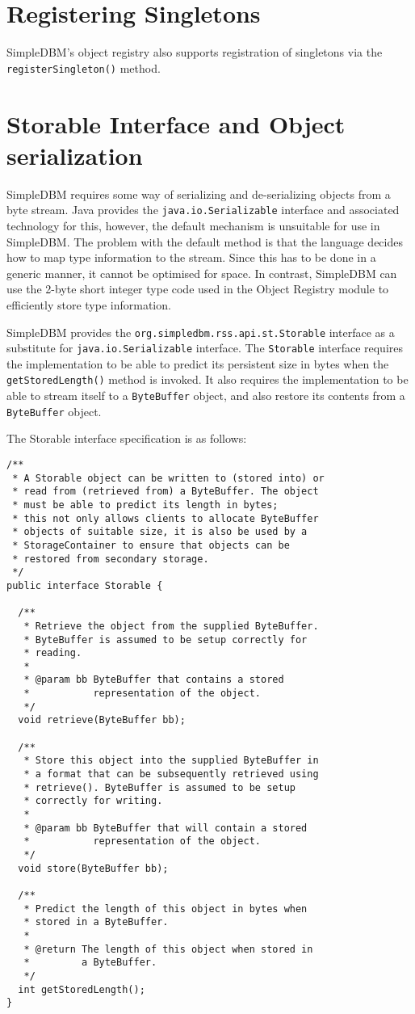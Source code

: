 \documentclass[a4paper,draft,oneside]{book}
\begin{document}
\section{Registering Singletons}
SimpleDBM's object registry also supports registration of
singletons via the \verb|registerSingleton()| method. 

\section{Storable Interface and Object serialization}
SimpleDBM requires some way of serializing and de-serializing
objects from a byte stream. Java provides the \verb|java.io.Serializable|
interface and associated technology for this, however, the default
mechanism is unsuitable for use in SimpleDBM. The problem with the
default method is that the language decides how to map type
information to the stream. Since this has to be done in a generic
manner, it cannot be optimised for space. In contrast, SimpleDBM can
use the 2-byte short integer type code used in the Object Registry
module to efficiently store type information.

SimpleDBM provides the \verb|org.simpledbm.rss.api.st.Storable|
interface as a substitute for \verb|java.io.Serializable|
interface. The \verb|Storable| interface requires the implementation
to be able to predict its persistent size in bytes when the
\verb|getStoredLength()| method is invoked. It also requires the
implementation to be able to stream itself to a \verb|ByteBuffer|
object, and also restore its contents from a \verb|ByteBuffer| object.

The Storable interface specification is as follows:

\begin{verbatim}
/**
 * A Storable object can be written to (stored into) or 
 * read from (retrieved from) a ByteBuffer. The object 
 * must be able to predict its length in bytes;
 * this not only allows clients to allocate ByteBuffer 
 * objects of suitable size, it is also be used by a 
 * StorageContainer to ensure that objects can be
 * restored from secondary storage.
 */
public interface Storable {

  /**
   * Retrieve the object from the supplied ByteBuffer. 
   * ByteBuffer is assumed to be setup correctly for 
   * reading.
   * 
   * @param bb ByteBuffer that contains a stored 
   *           representation of the object.
   */
  void retrieve(ByteBuffer bb);

  /**
   * Store this object into the supplied ByteBuffer in 
   * a format that can be subsequently retrieved using 
   * retrieve(). ByteBuffer is assumed to be setup 
   * correctly for writing.
   * 
   * @param bb ByteBuffer that will contain a stored 
   *           representation of the object.
   */
  void store(ByteBuffer bb);

  /**
   * Predict the length of this object in bytes when 
   * stored in a ByteBuffer.
   * 
   * @return The length of this object when stored in 
   *         a ByteBuffer.
   */
  int getStoredLength();
}
\end{verbatim}
\end{document}
